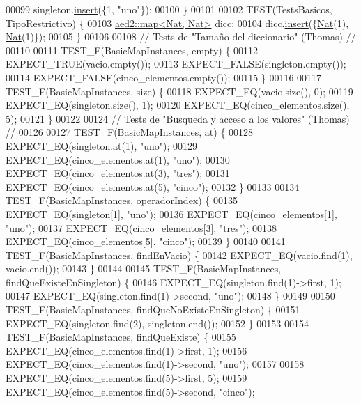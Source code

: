 \begin{DoxyCode}
00099     singleton.\hyperlink{classaed2_1_1map_a6941cde9a79c27f054b5c97a587a1854_a6941cde9a79c27f054b5c97a587a1854}{insert}(\{1, \textcolor{stringliteral}{"uno"}\});
00100 \}
00101 
00102 TEST(TestsBasicos, TipoRestrictivo) \{
00103     \hyperlink{classaed2_1_1map}{aed2::map<Nat, Nat>} dicc;
00104     dicc.\hyperlink{classaed2_1_1map_a6941cde9a79c27f054b5c97a587a1854_a6941cde9a79c27f054b5c97a587a1854}{insert}(\{\hyperlink{classNat}{Nat}(1), \hyperlink{classNat}{Nat}(1)\});
00105 \}
00106 
00108 \textcolor{comment}{// Tests de "Tamaño del diccionario" (Thomas) //}
00110 \textcolor{comment}{}
00111 TEST\_F(BasicMapInstances, empty) \{
00112     EXPECT\_TRUE(vacio.empty());
00113     EXPECT\_FALSE(singleton.empty());
00114     EXPECT\_FALSE(cinco\_elementos.empty());
00115 \}
00116 
00117 TEST\_F(BasicMapInstances, size) \{
00118     EXPECT\_EQ(vacio.size(), 0);
00119     EXPECT\_EQ(singleton.size(), 1);
00120     EXPECT\_EQ(cinco\_elementos.size(), 5);
00121 \}
00122 
00124 \textcolor{comment}{// Tests de "Busqueda y acceso a los valores" (Thomas) //}
00126 \textcolor{comment}{}
00127 TEST\_F(BasicMapInstances, at) \{
00128     EXPECT\_EQ(singleton.at(1), \textcolor{stringliteral}{"uno"});
00129     EXPECT\_EQ(cinco\_elementos.at(1), \textcolor{stringliteral}{"uno"});
00130     EXPECT\_EQ(cinco\_elementos.at(3), \textcolor{stringliteral}{"tres"});
00131     EXPECT\_EQ(cinco\_elementos.at(5), \textcolor{stringliteral}{"cinco"});
00132 \}
00133 
00134 TEST\_F(BasicMapInstances, operadorIndex) \{
00135     EXPECT\_EQ(singleton[1], \textcolor{stringliteral}{"uno"});
00136     EXPECT\_EQ(cinco\_elementos[1], \textcolor{stringliteral}{"uno"});
00137     EXPECT\_EQ(cinco\_elementos[3], \textcolor{stringliteral}{"tres"});
00138     EXPECT\_EQ(cinco\_elementos[5], \textcolor{stringliteral}{"cinco"});
00139 \}
00140 
00141 TEST\_F(BasicMapInstances, findEnVacio) \{
00142     EXPECT\_EQ(vacio.find(1), vacio.end());
00143 \}
00144 
00145 TEST\_F(BasicMapInstances, findQueExisteEnSingleton) \{
00146     EXPECT\_EQ(singleton.find(1)->first, 1);
00147     EXPECT\_EQ(singleton.find(1)->second, \textcolor{stringliteral}{"uno"});
00148 \}
00149 
00150 TEST\_F(BasicMapInstances, findQueNoExisteEnSingleton) \{
00151     EXPECT\_EQ(singleton.find(2), singleton.end());
00152 \}
00153 
00154 TEST\_F(BasicMapInstances, findQueExiste) \{
00155     EXPECT\_EQ(cinco\_elementos.find(1)->first, 1);
00156     EXPECT\_EQ(cinco\_elementos.find(1)->second, \textcolor{stringliteral}{"uno"});
00157 
00158     EXPECT\_EQ(cinco\_elementos.find(5)->first, 5);
00159     EXPECT\_EQ(cinco\_elementos.find(5)->second, \textcolor{stringliteral}{"cinco"});

\end{DoxyCode}
